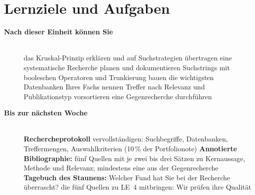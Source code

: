 \section{Lernziele und Aufgaben}
\begin{description}
\item[{\rot\bf Nach dieser Einheit können Sie}]~\\[-\lblskip]
\bi
  \ite das Kruskal-Prinzip erklären und auf Suchstrategien übertragen
  \ite eine systematische Recherche planen und dokumentieren
  \ite Suchstrings mit booleschen Operatoren und Trunkierung bauen
  \ite die wichtigsten Datenbanken Ihres Fachs nennen
  \ite Treffer nach Relevanz und Publikationstyp vorsortieren
  \ite eine Gegenrecherche durchführen
\ei
\os{\newpage}

\item[{\rot\bf Bis zur nächsten Woche}]~\\[-\lblskip]
\bi
  \ite \textbf{Rechercheprotokoll} vervollständigen: Suchbegriffe,
    Datenbanken, Treffermengen, Auswahlkriterien (10\,\% der
    Portfolionote)
  \ite \textbf{Annotierte Bibliographie:} fünf Quellen mit je zwei bis drei
    Sätzen zu Kernaussage, Methode und Relevanz; mindestens eine aus der
    Gegenrecherche
  \ite \textbf{Tagebuch des Staunens:} Welcher Fund hat Sie bei der
    Recherche überrascht?
  \ite die fünf Quellen zu LE~4 mitbringen: Wir prüfen ihre Qualität
\ei
\os{\newpage}
\end{description}


